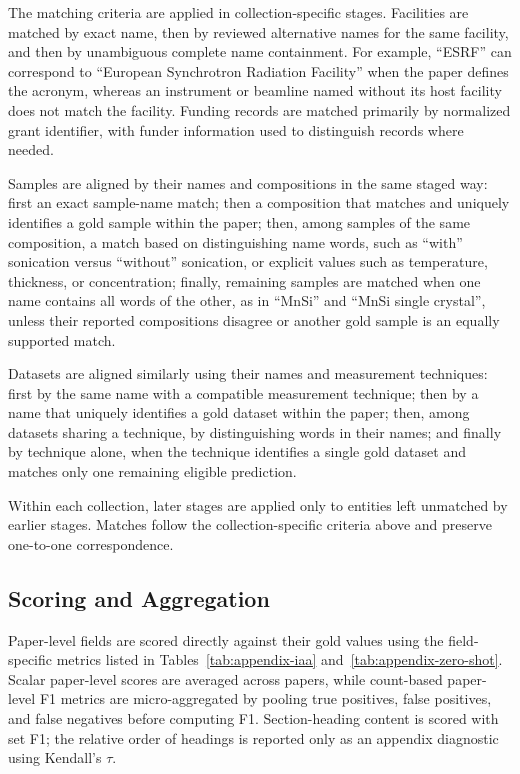 The matching criteria are applied in collection-specific stages. Facilities
are matched by exact name, then by reviewed alternative names for the same
facility, and then by unambiguous complete name containment. For example,
``ESRF'' can correspond to ``European Synchrotron Radiation Facility'' when
the paper defines the acronym, whereas an instrument or beamline named without 
its host facility does not match the facility. Funding records are matched
primarily by normalized grant identifier, with funder information used to 
distinguish records where needed.

Samples are aligned by their names and compositions in the same staged way: first an exact
sample-name match; then a composition that matches and uniquely identifies a
gold sample within the paper; then, among samples of the same composition, 
a match based on distinguishing name words, such as ``with'' sonication versus 
``without'' sonication, or explicit values such as temperature, thickness, or concentration; 
finally, remaining samples are matched when one name contains all words
of the other, as in ``MnSi'' and ``MnSi single crystal'', unless their
reported compositions disagree or another gold sample is an equally
supported match. 

Datasets are aligned similarly using their names and measurement techniques: 
first by the same name with a compatible measurement technique; then by a name that uniquely 
identifies a gold dataset within the paper; then, among datasets sharing a technique, by 
distinguishing words in their names; and finally by technique alone, when the technique identifies 
a single gold dataset and matches only one remaining eligible prediction.

Within each collection, later stages are applied only to entities left
unmatched by earlier stages. Matches follow the collection-specific
criteria above and preserve one-to-one correspondence.

\subsection{Scoring and Aggregation}
\label{sec:scoring-aggregation}

Paper-level fields are scored directly against their gold values using the
field-specific metrics listed in Tables~\ref{tab:appendix-iaa}
and~\ref{tab:appendix-zero-shot}. Scalar paper-level scores are averaged
across papers, while count-based paper-level F1 metrics are micro-aggregated
by pooling true positives, false positives, and false negatives before
computing F1. Section-heading content is scored with set F1; the relative order
of headings is reported only as an appendix diagnostic using Kendall's
$\tau$.


